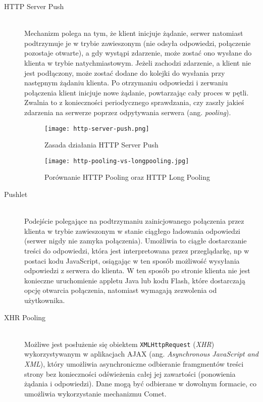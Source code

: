 \begin{description}
  \item[HTTP Server Push] \hfill \\
  Mechanizm polega na tym, że klient inicjuje żądanie, serwer natomiast podtrzymuje je w trybie zawieszonym (nie odsyła odpowiedzi, połączenie pozostaje otwarte), a gdy wystąpi zdarzenie, może zostać ono wysłane do klienta w trybie natychmiastowym. Jeżeli zachodzi zdarzenie, a klient nie jest podłączony, może zostać dodane do kolejki do wysłania przy następnym żądaniu klienta. Po otrzymaniu odpowiedzi i zerwaniu połączenia klient inicjuje nowe żądanie, powtarzając cały proces w pętli. Zwalnia to z konieczności periodycznego sprawdzania, czy zaszły jakieś zdarzenia na serwerze poprzez odpytywania serwera (ang. \emph{pooling}).

  \begin{figure}[H]
    \centering
      \texttt{[image: http-server-push.png]}
    \caption[Zasada działania HTTP Server Push]{Zasada działania HTTP Server Push}
  \end{figure}

  \begin{figure}[H]
    \centering
      \texttt{[image: http-pooling-vs-longpooling.jpg]}
    \caption[Porównanie HTTP Pooling oraz HTTP Long Pooling]{Porównanie HTTP Pooling oraz HTTP Long Pooling}
  \end{figure}

  \item[Pushlet] \hfill \\
  Podejście polegające na podtrzymaniu zainicjowanego połączenia przez klienta w trybie zawieszonym w stanie ciągłego ładowania odpowiedzi (serwer nigdy nie zamyka połączenia). Umożliwia to ciągłe dostarczanie treści do odpowiedzi, która jest interpretowana przez przeglądarkę, np w postaci kodu JavaScript, osiągając w ten sposób możliwość wysyłania odpowiedzi z serwera do klienta. W ten sposób po stronie klienta nie jest konieczne uruchomienie appletu Java lub kodu Flash, które dostarczają opcję otwarcia połączenia, natomiast wymagają zezwolenia od użytkownika.

  \item[XHR Pooling] \hfill \\
  Możliwe jest posłużenie się obiektem \lstinline{XMLHttpRequest} (\emph{XHR})\cite{xhr-rfc} wykorzystywanym w aplikacjach AJAX (ang. \emph{Asynchronous JavaScript and XML}), który umożliwia asynchroniczne odbieranie framgmentów treści strony bez konieczności odświeżenia całej jej zawartości (ponowienia żądania i odpowiedzi). Dane mogą być odbierane w dowolnym formacie, co umożliwia wykorzystanie mechanizmu Comet.\\


\end{description}
